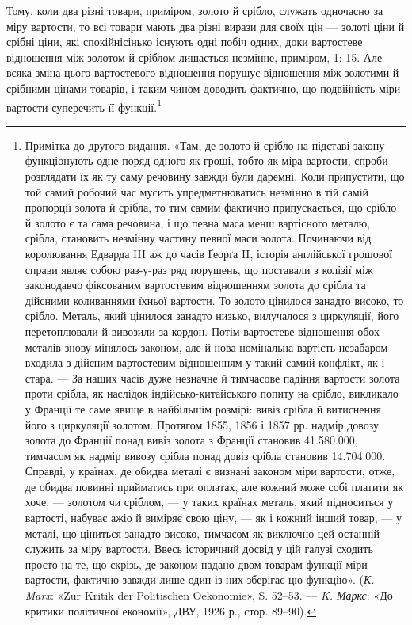 Тому, коли два різні товари, приміром, золото й срібло,
служать одночасно за міру вартости, то всі товари мають два
різні вирази для своїх цін — золоті ціни й срібні ціни, які спокійнісінько
існують одні побіч одних, доки вартостеве відношення
між золотом й сріблом лишається незмінне, приміром,
1: 15. Але всяка зміна цього вартостевого відношення порушує
відношення між золотими й срібними цінами товарів, і таким
чином доводить фактично, що подвійність міри вартости суперечить
її функції.\footnote{
Примітка до другого видання. «Там, де золото й срібло на підставі
закону функціонують одне поряд одного як гроші, тобто як міра вартости,
спроби розглядати їх як ту саму речовину завжди були даремні. Коли припустити, що той самий робочий
час мусить упредметнюватись незмінно в тій самій пропорції золота й срібла, то тим самим фактично
припускається, що срібло й золото є та сама речовина, і що певна маса менш вартісного металю,
срібла, становить незмінну частину певної маси золота. Починаючи від королювання Едварда III аж до
часів Ґеорґа II, історія англійської грошової справи являє собою раз-у-раз ряд порушень, що
поставали з колізії між законодавчо фіксованим вартостевим відношенням
золота до срібла та дійсними коливаннями їхньої вартости. То золото цінилося занадто високо, то
срібло. Металь, який цінилося занадто низько, вилучалося з циркуляції, його перетоплювали й вивозили
за кордон. Потім вартостеве відношення обох металів знову мінялось законом, але й нова номінальна
вартість незабаром входила з дійсним вартостевим відношенням у такий самий конфлікт, як і стара. —
За наших часів дуже
незначне й тимчасове падіння вартости золота проти срібла, як наслідок індійсько-китайського попиту
на срібло, викликало у Франції те саме явище в найбільшім розмірі: вивіз срібла й витиснення його з
циркуляції золотом. Протягом 1855, 1856 і 1857 рр. надмір довозу золота до Франції понад вивіз
золота з Франції становив 41.580.000, тимчасом як надмір вивозу срібла понад довіз
срібла становив 14.704.000. Справді, у країнах, де обидва металі є визнані законом
міри вартости, отже, де обидва повинні прийматись при оплатах, але кожний може собі платити як хоче,
— золотом чи сріблом, — у таких країнах металь, який підноситься у вартості, набуває ажіо й виміряє
свою ціну, — як і кожний інший товар, — у металі, що ціниться занадто високо, тимчасом як виключно
цей останній служить за міру вартости. Ввесь історичний досвід у цій галузі сходить просто на те, що
скрізь, де законом надано двом товарам функції міри вартости, фактично завжди лише один із них
зберігає цю функцію». (\emph{К. Marx}: «Zur Kritik der Politischen Oekonomie», S. 52--53. — \emph{K. Маркс}: «До
критики політичної економії», ДВУ, 1926 р., стор. 89--90).
}

